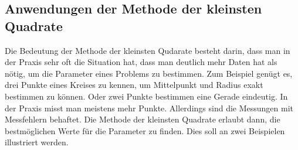%
%
\subsection{Anwendungen der Methode der kleinsten Quadrate}
Die Bedeutung der Methode der kleinsten Qudarate besteht darin, dass 
man in der Praxis sehr oft die Situation hat, dass man deutlich mehr
Daten hat als nötig, um die Parameter eines Problems zu bestimmen.
Zum Beispiel genügt es, drei Punkte eines Kreises zu kennen, um
Mittelpunkt und Radius exakt bestimmen zu können.
Oder zwei Punkte bestimmen eine Gerade eindeutig.
In der Praxis misst man meistens mehr Punkte.
Allerdings sind die Messungen mit Messfehlern behaftet.
Die Methode der kleinsten Quadrate erlaubt dann, die bestmöglichen
Werte für die Parameter zu finden.
Dies soll an zwei Beispielen illustriert werden.

